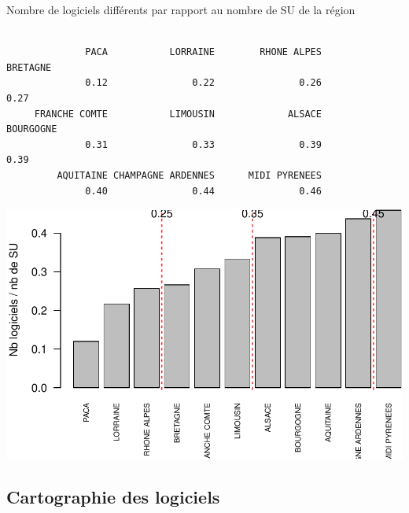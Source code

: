 \documentclass[]{article}
\begin{document}
Nombre de logiciels différents par rapport au nombre de SU de la région

\begin{verbatim}

              PACA           LORRAINE        RHONE ALPES           BRETAGNE 
              0.12               0.22               0.26               0.27 
     FRANCHE COMTE           LIMOUSIN             ALSACE          BOURGOGNE 
              0.31               0.33               0.39               0.39 
         AQUITAINE CHAMPAGNE ARDENNES      MIDI PYRENEES 
              0.40               0.44               0.46 
\end{verbatim}

\includegraphics{septembre2015_files/figure-latex/unnamed-chunk-10-1.pdf}

\subsection{Cartographie des
logiciels}\label{cartographie-des-logiciels}
\end{document}
